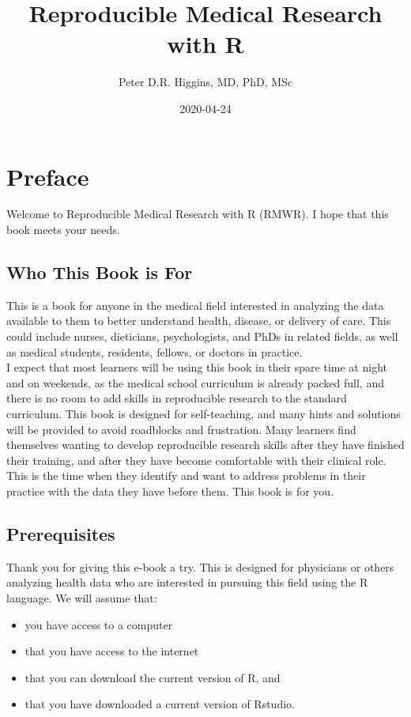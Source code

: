 \documentclass[
]{book}
\title{Reproducible Medical Research with R}
\author{Peter D.R. Higgins, MD, PhD, MSc}
\date{2020-04-24}
\providecommand{\tightlist}{%
  \setlength{\itemsep}{0pt}\setlength{\parskip}{0pt}}
\begin{document}
\maketitle

{
\setcounter{tocdepth}{1}
\tableofcontents
}
\hypertarget{preface}{%
\chapter{Preface}\label{preface}}

Welcome to Reproducible Medical Research with R (RMWR). I hope that this book meets your needs.

\hypertarget{who-this-book-is-for}{%
\section{Who This Book is For}\label{who-this-book-is-for}}

This is a book for anyone in the medical field interested in analyzing the data available to them to better understand health, disease, or delivery of care. This could include nurses, dieticians, psychologists, and PhDs in related fields, as well as medical students, residents, fellows, or doctors in practice.\\
I expect that most learners will be using this book in their spare time at night and on weekends, as the medical school curriculum is already packed full, and there is no room to add skills in reproducible research to the standard curriculum. This book is designed for self-teaching, and many hints and solutions will be provided to avoid roadblocks and frustration.
Many learners find themselves wanting to develop reproducible research skills after they have finished their training, and after they have become comfortable with their clinical role. This is the time when they identify and want to address problems in their practice with the data they have before them. This book is for you.

\hypertarget{prerequisites}{%
\section{Prerequisites}\label{prerequisites}}

Thank you for giving this e-book a try. This is designed for physicians or others analyzing health data who are interested in pursuing this field using the R language.
We will assume that:

\begin{itemize}
\tightlist
\item
  you have access to a computer
\item
  that you have access to the internet
\item
  that you can download the current version of R, and
\item
  that you have downloaded a current version of Rstudio.
\end{itemize}
\end{document}

